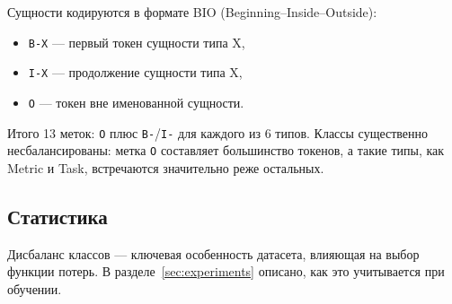 Сущности кодируются в формате BIO (Beginning--Inside--Outside):
\begin{itemize}
    \item \texttt{B-X} --- первый токен сущности типа X,
    \item \texttt{I-X} --- продолжение сущности типа X,
    \item \texttt{O} --- токен вне именованной сущности.
\end{itemize}

Итого 13 меток: \texttt{O} плюс \texttt{B-}/\texttt{I-} для каждого из 6 типов. Классы существенно несбалансированы: метка \texttt{O} составляет большинство токенов, а такие типы, как Metric и Task, встречаются значительно реже остальных.

\subsection{Статистика}

Дисбаланс классов --- ключевая особенность датасета, влияющая на выбор функции потерь. В разделе~\ref{sec:experiments} описано, как это учитывается при обучении.
